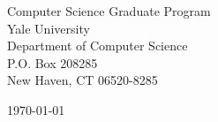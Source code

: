 \begin{minipage}{0.49\textwidth}
\begin{flushleft}
\noindent
Computer Science Graduate Program\\
Yale University\\
Department of Computer Science\\
P.O. Box 208285\\
New Haven, CT 06520-8285
\end{flushleft}
\end{minipage}
\begin{minipage}{0.47\textwidth}
\begin{flushright}
\today
\end{flushright}
\end{minipage} \\

\newcommand{\univ}{Yale University}
\newcommand{\univshort}{Yale}
\newcommand{\degree}{Ph.D.}
\newcommand{\dept}{Computer Science}
